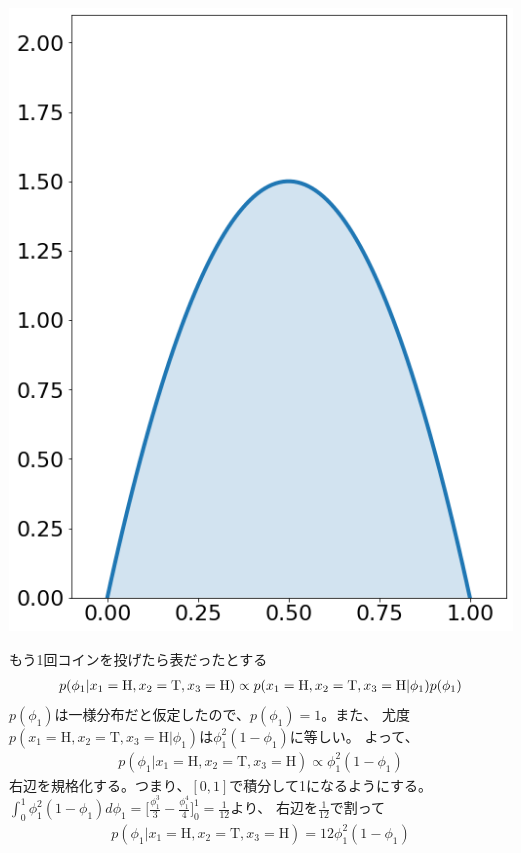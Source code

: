 \documentclass[aspectratio=169,unicode,dvipdfmx,14pt]{beamer}
\begin{document}
\begin{frame}
\begin{textblock*}{0.4\linewidth}
    \includegraphics[width=\linewidth]{beta_2_2.png}
\end{textblock*}
\end{frame}

\begin{frame}{もう1回コインを投げたら表だったとする}
\vspace{-.3in}
\begin{align}
p(\phi_1 | x_1 = \mbox{H}, x_2 = \mbox{T}, x_3 = \mbox{H}) 
\propto p(x_1 = \mbox{H}, x_2 = \mbox{T}, x_3 = \mbox{H} | \phi_1) p(\phi_1)
\notag
\end{align}
$p(\phi_1)$は一様分布だと仮定したので、$p(\phi_1)=1$。また、
尤度$p(x_1 = \mbox{H}, x_2 = \mbox{T}, x_3 = \mbox{H} | \phi_1)$は$\phi_1^2(1-\phi_1)$に等しい。
よって、
\begin{align}
p(\phi_1 | x_1 = \mbox{H}, x_2 = \mbox{T}, x_3 = \mbox{H}) \propto \phi_1^2(1-\phi_1)
\end{align}
右辺を規格化する。つまり、$[0,1]$で積分して1になるようにする。
$\int_0^1 \phi_1^2(1-\phi_1) d\phi_1 =\Big[ \frac{\phi_1^3}{3} - \frac{\phi_1^4}{4} \Big]_0^1= \frac{1}{12}$より、
右辺を$\frac{1}{12}$で割って
\begin{align}
p(\phi_1 | x_1 = \mbox{H}, x_2 = \mbox{T}, x_3 = \mbox{H}) = 12\phi_1^2(1-\phi_1)
\end{align}
\end{frame}
\end{document}
